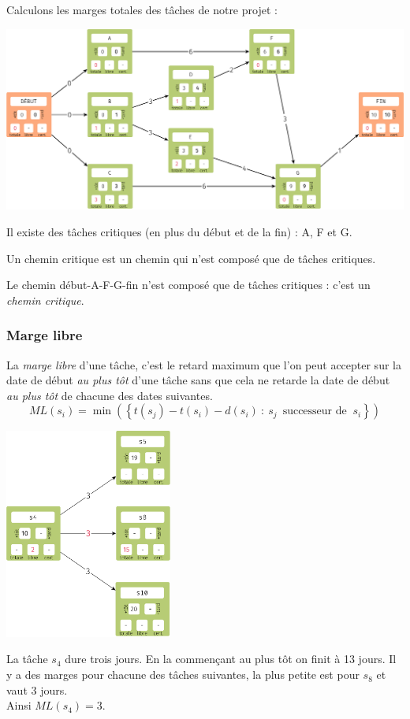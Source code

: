 Calculons les marges totales des tâches de notre projet :

\begin{center}
    \includegraphics[width=\linewidth]{graphes2/img/exemple_mpm4.png}
\end{center}

Il existe des tâches critiques (en plus du début et de la fin) : A, F et G.

\begin{definition}
    Un chemin critique est un chemin qui n'est composé que de tâches critiques.
\end{definition}

Le chemin début-A-F-G-fin n'est composé que de tâches critiques : c'est un \textit{chemin critique}.

\subsubsection*{Marge libre}

\begin{definition}
    La \textit{marge libre} d'une tâche, c'est le retard maximum que l'on peut accepter sur la date de début \textit{au plus tôt} d'une tâche sans que cela ne retarde la date de début \textit{au plus tôt} de chacune des dates suivantes.
    $$ML(s_i)=\min\left(\left\{t(s_j)-t(s_i)-d(s_i)\::\:s_j\,\text{ successeur de }\:s_i\right\}\right)$$
\end{definition}
\begin{exemple}[]
    \begin{center}
        \includegraphics[width=5.5cm]{graphes2/img/mpm_marge_libre.png}
    \end{center}
    La tâche $s_4$ dure trois jours. En la commençant au plus tôt on finit à 13 jours. Il y a des marges pour chacune des tâches suivantes, la plus petite est pour $s_8$ et vaut 3 jours. \\
    Ainsi $ML(s_4)=3$.
\end{exemple}

